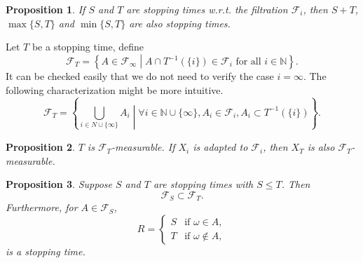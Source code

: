 \documentclass[openany]{book}
\newtheorem{proposition}{Proposition}[chapter]
\theoremstyle{definition}
\theoremstyle{remark}
\begin{document}
\begin{proposition}
    If $S$ and $T$ are stopping times w.r.t. the filtration $\mathcal{F}_i$, then $S+T$, $\max\{S,T\}$ and $\min\{S,T\}$ are also stopping times.
\end{proposition}
Let $T$ be a stopping time, define
\begin{equation*}
    \mathcal{F}_T=\left\{A\in \mathcal{F}_{\infty}\middle|A\cap T^{-1}\left(\{i\}\right)\in \mathcal{F}_i\textrm{ for all }i\in \mathbb{N}\right\}.
\end{equation*}
It can be checked easily that we do not need to verify the case $i=\infty$. The following characterization might be more intuitive.
\begin{equation*}
    \mathcal{F}_T=\left\{\bigcup_{i\in N\cup\{\infty\}}A_i\middle|\forall i\in \mathbb{N}\cup\{\infty\},A_i\in \mathcal{F}_i,A_i\subset T^{-1}\left(\{i\}\right)\right\}.
\end{equation*}
\begin{proposition}
    $T$ is $\mathcal{F}_T$-measurable. If $X_i$ is adapted to $\mathcal{F}_i$, then $X_T$ is also $\mathcal{F}_T$-measurable.
\end{proposition}
\begin{proposition}
    Suppose $S$ and $T$ are stopping times with $S\le T$. Then
    \begin{equation*}
        \mathcal{F}_S\subset \mathcal{F}_T.
    \end{equation*}
    Furthermore, for $A\in \mathcal{F}_S$,
    \begin{equation*}
        R=\left\{
        \begin{array}{ll}
            S & \textrm{if }\omega\in A, \\
            T & \textrm{if }\omega\not\in A,
        \end{array}
        \right.
    \end{equation*}
    is a stopping time.
\end{proposition}
\end{document}
